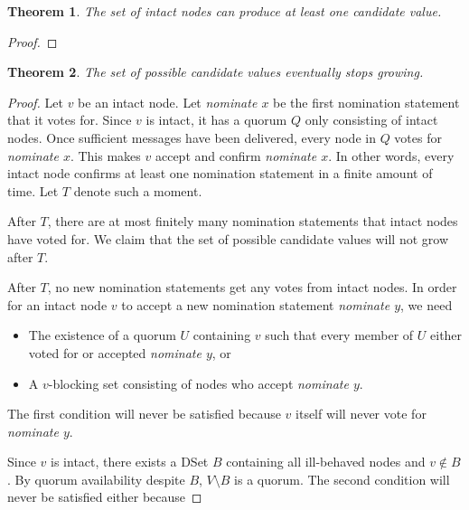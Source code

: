 \documentclass[12pt, psamsfonts]{amsart}
\newtheorem{thm}{Theorem}[subsection]
\theoremstyle{definition}
\theoremstyle{remark}
\numberwithin{equation}{subsection}
\begin{document}
\begin{thm}
    The set of intact nodes can produce at least one candidate value.
\end{thm}

\begin{proof}
\end{proof}

\begin{thm}
    The set of possible candidate values eventually stops growing.
\end{thm}

\begin{proof}
    Let $v$ be an intact node.
    Let \textit{nominate  $x$} be the first nomination statement that it votes for.
    Since $v$ is intact, it has a quorum $Q$ only consisting of intact nodes.
    Once sufficient messages have been delivered, every node in $Q$ votes for \textit{nominate $x$}.
    This makes $v$ accept and confirm \textit{nominate $x$}.
    In other words, every intact node confirms at least one nomination statement in a finite amount of time.
    Let $T$ denote such a moment.

    After $T$, there are at most finitely many nomination statements that intact nodes have voted for.
    We claim that the set of possible candidate values will not grow after $T$.

    After $T$, no new nomination statements get any votes from intact nodes.
    In order for an intact node $v$ to accept a new nomination statement \textit{nominate $y$}, we need
    \begin{itemize}
        \item
            The existence of a quorum $U$ containing $v$ such that every member of $U$ either voted for or accepted \textit{nominate $y$}, or
        \item
            A $v$-blocking set consisting of nodes who accept \textit{nominate $y$}.
    \end{itemize}
    The first condition will never be satisfied because $v$ itself will never vote for \textit{nominate $y$}.

    Since $v$ is intact, there exists a DSet $B$ containing all ill-behaved nodes and $v \notin B$.
    By quorum availability despite $B$, $V \setminus B$ is a quorum.
    The second condition will never be satisfied either because 
\end{proof}
\end{document}
